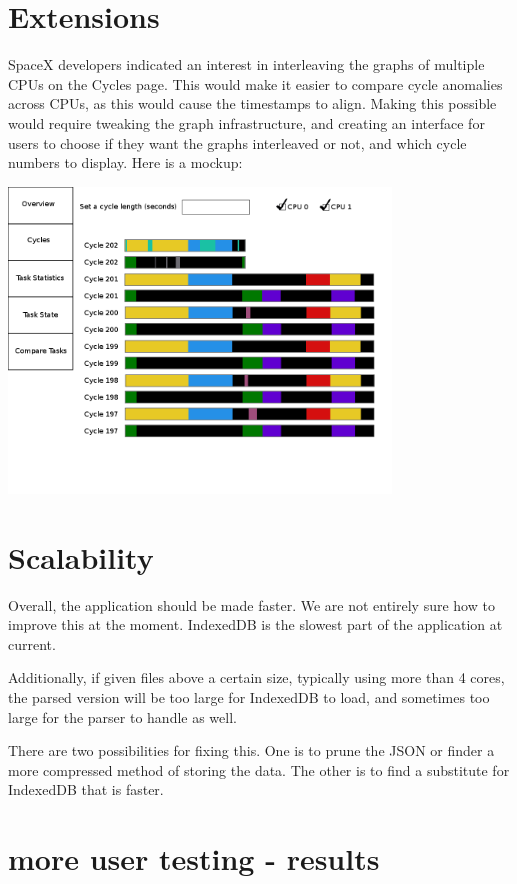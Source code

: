 \documentclass{hmcclinic}
\begin{document}
\section{Extensions}
  SpaceX developers indicated an interest in interleaving the graphs of multiple
  CPUs on the Cycles page.  This would make it easier to compare cycle
  anomalies across CPUs, as this would cause the timestamps to align. Making
  this possible would require tweaking the graph infrastructure, and creating an
  interface for users to choose if they want the graphs interleaved or not, and
  which cycle numbers to display. Here is a mockup:

\begin{center}
\includegraphics[width=4in]{futureCycles.png}
\end{center}

\section{Scalability}
  Overall, the application should be made faster. We are not entirely sure how
  to improve this at the moment. IndexedDB is the slowest part of the
  application at current.

Additionally, if given files above a certain size, typically using more than 4
cores, the parsed version will be too large for IndexedDB to load, and
sometimes too large for the parser to handle as well.

There are two possibilities for fixing this. One is to prune the JSON or
finder a more compressed method of storing the data. The other is to find a
substitute for IndexedDB that is faster.
\section{more user testing - results}
\end{document}
